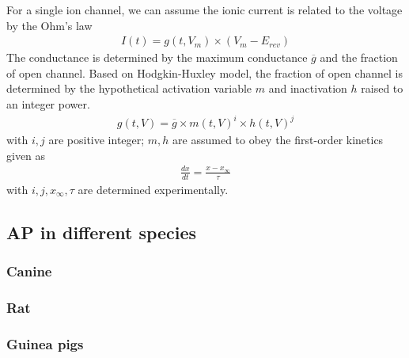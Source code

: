 For a single ion channel, we can assume the ionic current is related
to the voltage by the Ohm's law
\begin{eqnarray}
  \label{eq:397}
  I(t) = g(t,V_m)\times (V_m-E_{rev})
\end{eqnarray}
The conductance is determined by the maximum conductance $\overline{g}$ and
the fraction of open channel. Based on Hodgkin-Huxley model, the
fraction of open channel is determined by the hypothetical activation
variable $m$ and inactivation $h$ raised to an integer power.
\begin{eqnarray}
  \label{eq:398}
  g(t,V) = \overline{g} \times m(t,V)^i \times h(t,V)^j
\end{eqnarray}
with $i,j$ are positive integer; $m,h$ are assumed to obey the
first-order kinetics given as
\begin{eqnarray}
  \label{eq:399}
  \frac{dx}{dt} = \frac{x-x_\infty}{\tau}
\end{eqnarray}
with $i,j,x_\infty,\tau$ are determined experimentally. %



\subsection{AP in different species}
\label{sec:detail-ap-different}

\subsubsection{Canine}
\label{sec:canine}

\subsubsection{Rat}
\label{sec:rat}


\subsubsection{Guinea pigs}
\label{sec:guinea-pigs}




